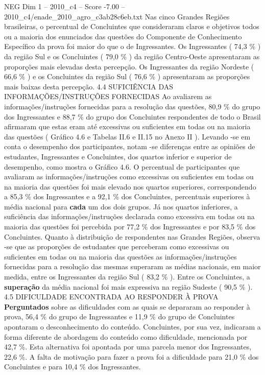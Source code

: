 \begin{textsample}{NEG Dim 1 – 2010\_c4 – Score -7.00 – 2010\_c4/enade\_2010\_agro\_c3ab28c6eb.txt}
Nas cinco Grandes Regiões brasileiras, o percentual de Concluintes que consideraram claros e objetivos todos ou a maioria dos enunciados das questões do Componente de Conhecimento Específico da prova foi maior do que o de Ingressantes.
Os Ingressantes ( 74,3 \% ) da região Sul e os Concluintes ( 79,0 \% ) da região Centro-Oeste apresentaram as proporções mais elevadas desta percepção.
Os Ingressantes da região Nordeste ( 66,6 \% ) e os Concluintes da região Sul ( 76,6 \% ) apresentaram as proporções mais baixas desta percepção. 4.4 SUFICIÊNCIA DAS INFORMAÇÕES/INSTRUÇÕES FORNECIDAS Ao avaliarem as informações/instruções fornecidas para a resolução das questões, 80,9 \% do grupo dos Ingressantes e 88,7 \% do grupo dos Concluintes respondentes de todo o Brasil afirmaram que estas eram até excessivas ou suficientes em todas ou na maioria das questões ( Gráfico 4.6 e Tabelas II.6 e II.15 no Anexo II ).
Levando -se em conta o desempenho dos participantes, notam -se diferenças entre as opiniões de estudantes, Ingressantes e Concluintes, dos quartos inferior e superior de desempenho, como mostra o Gráfico 4.6.
O percentual de participantes que avaliaram as informações/instruções como excessivas ou suficientes em todas ou na maioria das questões foi mais elevado nos quartos superiores, correspondendo a 85,3 \% dos Ingressantes e a 92,1 \% dos Concluintes, percentuais superiores à média nacional para \textbf{cada} um dos dois grupos.
Já nos quartos inferiores, a suficiência das informações/instruções declarada como excessiva em todas ou na maioria das questões foi percebida por 77,2 \% dos Ingressantes e por 83,5 \% dos Concluintes.
Quanto à distribuição de respondentes nas Grandes Regiões, observa -se que as proporções de estudantes que perceberam como excessivas ou suficientes em todas ou na maioria das questões as informações/instruções fornecidas para a resolução das mesmas superaram as médias nacionais, em maior medida, entre os Ingressantes da região Sul ( 83,2 \% ).
Entre os Concluintes, a \textbf{superação} da média nacional foi mais expressiva na região Sudeste ( 90,5 \% ). 4.5 DIFICULDADE ENCONTRADA AO RESPONDER À PROVA \textbf{Perguntados} sobre as dificuldades com as quais se depararam ao responder à prova, 56,4 \% do grupo de Ingressantes e 11,9 \% do grupo de Concluintes apontaram o desconhecimento do conteúdo.
Concluintes, por sua vez, indicaram a forma diferente de abordagem do conteúdo como dificuldade, mencionada por 42,7 \%.
Esta alternativa foi apontada por uma parcela menor dos Ingressantes, 22,6 \%.
A falta de motivação para fazer a prova foi a dificuldade para 21,0 \% dos Concluintes e para 10,4 \% dos Ingressantes.

\end{textsample}
